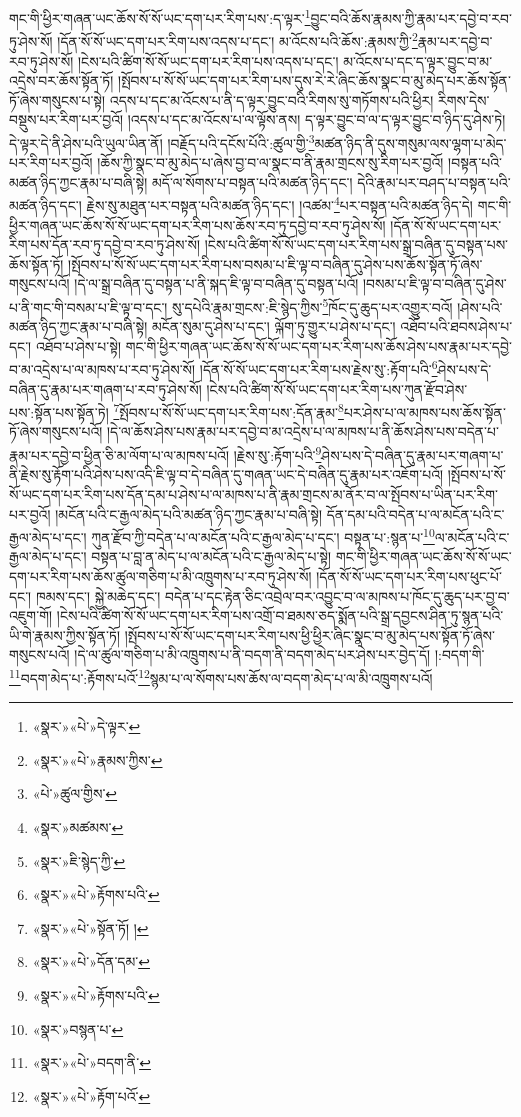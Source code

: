 གང་གི་ཕྱིར་གཞན་ཡང་ཆོས་སོ་སོ་ཡང་དག་པར་རིག་པས་:ད་ལྟར་\footnote{«སྣར་»«པེ་»དེ་ལྟར་}བྱུང་བའི་ཆོས་རྣམས་ཀྱི་རྣམ་པར་དབྱེ་བ་རབ་ཏུ་ཤེས་སོ། །དོན་སོ་སོ་ཡང་དག་པར་རིག་པས་འདས་པ་དང་། མ་འོངས་པའི་ཆོས་:རྣམས་ཀྱི་\footnote{«སྣར་»«པེ་»རྣམས་ཀྱིས་}རྣམ་པར་དབྱེ་བ་རབ་ཏུ་ཤེས་སོ། །ངེས་པའི་ཚིག་སོ་སོ་ཡང་དག་པར་རིག་པས་འདས་པ་དང་། མ་འོངས་པ་དང་ད་ལྟར་བྱུང་བ་མ་འདྲེས་བར་ཆོས་སྟོན་ཏོ། །སྤོབས་པ་སོ་སོ་ཡང་དག་པར་རིག་པས་དུས་རེ་རེ་ཞིང་ཆོས་སྣང་བ་མུ་མེད་པར་ཆོས་སྟོན་ཏོ་ཞེས་གསུངས་པ་སྟེ། འདས་པ་དང་མ་འོངས་པ་ནི་ད་ལྟར་བྱུང་བའི་རིགས་སུ་གཏོགས་པའི་ཕྱིར། རིགས་དེས་བསྡུས་པར་རིག་པར་བྱའོ། །འདས་པ་དང་མ་འོངས་པ་ལ་ལྟོས་ནས། ད་ལྟར་བྱུང་བ་ལ་ད་ལྟར་བྱུང་བ་ཉིད་དུ་ཤེས་ཏེ། དེ་ལྟར་དེ་ནི་ཤེས་པའི་ཡུལ་ཡིན་ནོ། །བརྗོད་པའི་དངོས་པོའི་:ཚུལ་གྱི་\footnote{«པེ་»ཚུལ་གྱིས་}མཚན་ཉིད་ནི་དུས་གསུམ་ལས་ལྷག་པ་མེད་པར་རིག་པར་བྱའོ། །ཆོས་ཀྱི་སྣང་བ་མུ་མེད་པ་ཞེས་བྱ་བ་ལ་སྣང་བ་ནི་རྣམ་གྲངས་སུ་རིག་པར་བྱའོ། །བསྟན་པའི་མཚན་ཉིད་ཀྱང་རྣམ་པ་བཞི་སྟེ། མདོ་ལ་སོགས་པ་བསྟན་པའི་མཚན་ཉིད་དང་། དེའི་རྣམ་པར་བཤད་པ་བསྟན་པའི་མཚན་ཉིད་དང་། རྗེས་སུ་མཐུན་པར་བསྟན་པའི་མཚན་ཉིད་དང་། །འཚམ་\footnote{«སྣར་»མཚམས་}པར་བསྟན་པའི་མཚན་ཉིད་དེ། གང་གི་ཕྱིར་གཞན་ཡང་ཆོས་སོ་སོ་ཡང་དག་པར་རིག་པས་ཆོས་རབ་ཏུ་དབྱེ་བ་རབ་ཏུ་ཤེས་སོ། །དོན་སོ་སོ་ཡང་དག་པར་རིག་པས་དོན་རབ་ཏུ་དབྱེ་བ་རབ་ཏུ་ཤེས་སོ། །ངེས་པའི་ཚིག་སོ་སོ་ཡང་དག་པར་རིག་པས་སྒྲ་བཞིན་དུ་བསྟན་པས་ཆོས་སྟོན་ཏོ། །སྤོབས་པ་སོ་སོ་ཡང་དག་པར་རིག་པས་བསམ་པ་ཇི་ལྟ་བ་བཞིན་དུ་ཤེས་པས་ཆོས་སྟོན་ཏོ་ཞེས་གསུངས་པའོ། །དེ་ལ་སྒྲ་བཞིན་དུ་བསྟན་པ་ནི་སྐད་ཇི་ལྟ་བ་བཞིན་དུ་བསྟན་པའོ། །བསམ་པ་ཇི་ལྟ་བ་བཞིན་དུ་ཤེས་པ་ནི་གང་གི་བསམ་པ་ཇི་ལྟ་བ་དང་། སུ་དཔེའི་རྣམ་གྲངས་:ཇི་སྙེད་ཀྱིས་\footnote{«སྣར་»ཇི་སྙེད་ཀྱི་}ཁོང་དུ་ཆུད་པར་འགྱུར་བའོ། །ཤེས་པའི་མཚན་ཉིད་ཀྱང་རྣམ་པ་བཞི་སྟེ། མངོན་སུམ་དུ་ཤེས་པ་དང་། ལྐོག་ཏུ་གྱུར་པ་ཤེས་པ་དང་། འཐོབ་པའི་ཐབས་ཤེས་པ་དང་། འཐོབ་པ་ཤེས་པ་སྟེ། གང་གི་ཕྱིར་གཞན་ཡང་ཆོས་སོ་སོ་ཡང་དག་པར་རིག་པས་ཆོས་ཤེས་པས་རྣམ་པར་དབྱེ་བ་མ་འདྲེས་པ་ལ་མཁས་པ་རབ་ཏུ་ཤེས་སོ། །དོན་སོ་སོ་ཡང་དག་པར་རིག་པས་རྗེས་སུ་:རྟོག་པའི་\footnote{«སྣར་»«པེ་»རྟོགས་པའི་}ཤེས་པས་དེ་བཞིན་དུ་རྣམ་པར་གཞག་པ་རབ་ཏུ་ཤེས་སོ། །ངེས་པའི་ཚིག་སོ་སོ་ཡང་དག་པར་རིག་པས་ཀུན་རྫོབ་ཤེས་པས་:སྟོན་པས་སྟོན་ཏེ། \footnote{«སྣར་»«པེ་»སྟོན་ཏོ། ། }སྤོབས་པ་སོ་སོ་ཡང་དག་པར་རིག་པས་:དོན་རྣམ་\footnote{«སྣར་»«པེ་»དོན་དམ་}པར་ཤེས་པ་ལ་མཁས་པས་ཆོས་སྟོན་ཏོ་ཞེས་གསུངས་པའོ། །དེ་ལ་ཆོས་ཤེས་པས་རྣམ་པར་དབྱེ་བ་མ་འདྲེས་པ་ལ་མཁས་པ་ནི་ཆོས་ཤེས་པས་བདེན་པ་རྣམ་པར་དབྱེ་བ་ཕྱིན་ཅི་མ་ལོག་པ་ལ་མཁས་པའོ། །རྗེས་སུ་:རྟོག་པའི་\footnote{«སྣར་»«པེ་»རྟོགས་པའི་}ཤེས་པས་དེ་བཞིན་དུ་རྣམ་པར་གཞག་པ་ནི་རྗེས་སུ་རྟོག་པའི་ཤེས་པས་འདི་ཇི་ལྟ་བ་དེ་བཞིན་དུ་གཞན་ཡང་དེ་བཞིན་དུ་རྣམ་པར་འཇོག་པའོ། །སྤོབས་པ་སོ་སོ་ཡང་དག་པར་རིག་པས་དོན་དམ་པ་ཤེས་པ་ལ་མཁས་པ་ནི་རྣམ་གྲངས་མ་ནོར་བ་ལ་སྤོབས་པ་ཡིན་པར་རིག་པར་བྱའོ། །མངོན་པའི་ང་རྒྱལ་མེད་པའི་མཚན་ཉིད་ཀྱང་རྣམ་པ་བཞི་སྟེ། དོན་དམ་པའི་བདེན་པ་ལ་མངོན་པའི་ང་རྒྱལ་མེད་པ་དང་། ཀུན་རྫོབ་ཀྱི་བདེན་པ་ལ་མངོན་པའི་ང་རྒྱལ་མེད་པ་དང་། བསྟན་པ་:སྙན་པ་\footnote{«སྣར་»བསྙན་པ་}ལ་མངོན་པའི་ང་རྒྱལ་མེད་པ་དང་། བསྟན་པ་བླ་ན་མེད་པ་ལ་མངོན་པའི་ང་རྒྱལ་མེད་པ་སྟེ། གང་གི་ཕྱིར་གཞན་ཡང་ཆོས་སོ་སོ་ཡང་དག་པར་རིག་པས་ཆོས་ཚུལ་གཅིག་པ་མི་འཁྲུགས་པ་རབ་ཏུ་ཤེས་སོ། །དོན་སོ་སོ་ཡང་དག་པར་རིག་པས་ཕུང་པོ་དང་། ཁམས་དང་། སྐྱེ་མཆེད་དང་། བདེན་པ་དང་རྟེན་ཅིང་འབྲེལ་བར་འབྱུང་བ་ལ་མཁས་པ་ཁོང་དུ་ཆུད་པར་བྱ་བ་འཇུག་གོ། །ངེས་པའི་ཚིག་སོ་སོ་ཡང་དག་པར་རིག་པས་འགྲོ་བ་ཐམས་ཅད་སྨོན་པའི་སྒྲ་དབྱངས་ཤིན་ཏུ་སྙན་པའི་ཡི་གེ་རྣམས་ཀྱིས་སྟོན་ཏོ། །སྤོབས་པ་སོ་སོ་ཡང་དག་པར་རིག་པས་ཕྱི་ཕྱིར་ཞིང་སྣང་བ་མུ་མེད་པས་སྟོན་ཏོ་ཞེས་གསུངས་པའོ། །དེ་ལ་ཚུལ་གཅིག་པ་མི་འཁྲུགས་པ་ནི་བདག་ནི་བདག་མེད་པར་ཤེས་པར་བྱེད་དོ། །:བདག་གི་\footnote{«སྣར་»«པེ་»བདག་ནི་}བདག་མེད་པ་:རྟོགས་པའོ་\footnote{«སྣར་»«པེ་»རྟོག་པའོ་}སྙམ་པ་ལ་སོགས་པས་ཆོས་ལ་བདག་མེད་པ་ལ་མི་འཁྲུགས་པའོ། 